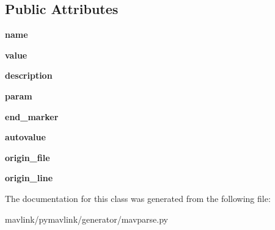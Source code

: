 \subsection*{Public Attributes}
\begin{DoxyCompactItemize}
\item 
\mbox{\label{classpymavlink_1_1generator_1_1mavparse_1_1MAVEnumEntry_a93164deaf93099ff9969b0744843fc05}} 
{\bfseries name}
\item 
\mbox{\label{classpymavlink_1_1generator_1_1mavparse_1_1MAVEnumEntry_a9c52385757eaadbc51b454b359d7b49e}} 
{\bfseries value}
\item 
\mbox{\label{classpymavlink_1_1generator_1_1mavparse_1_1MAVEnumEntry_a1bf829dd3493dd2c870f7c31edefc293}} 
{\bfseries description}
\item 
\mbox{\label{classpymavlink_1_1generator_1_1mavparse_1_1MAVEnumEntry_a23cc404ee05ef1bfd75a21b44c13e1ab}} 
{\bfseries param}
\item 
\mbox{\label{classpymavlink_1_1generator_1_1mavparse_1_1MAVEnumEntry_a396daeb4180aa6fa3947f02fbff103ee}} 
{\bfseries end\+\_\+marker}
\item 
\mbox{\label{classpymavlink_1_1generator_1_1mavparse_1_1MAVEnumEntry_a6d1e6a9cc71f85db360f8b1a6316e70d}} 
{\bfseries autovalue}
\item 
\mbox{\label{classpymavlink_1_1generator_1_1mavparse_1_1MAVEnumEntry_a492a7d08b0c02dc8566f12c4abd4fca5}} 
{\bfseries origin\+\_\+file}
\item 
\mbox{\label{classpymavlink_1_1generator_1_1mavparse_1_1MAVEnumEntry_af0afe9aac5abeaf6a0c234b9a13060f0}} 
{\bfseries origin\+\_\+line}
\end{DoxyCompactItemize}


The documentation for this class was generated from the following file\+:\begin{DoxyCompactItemize}
\item 
mavlink/pymavlink/generator/mavparse.\+py\end{DoxyCompactItemize}
